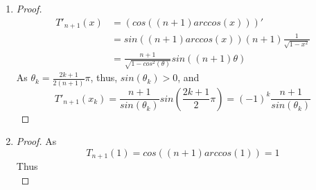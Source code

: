 \documentclass[paper=a4, fontsize=11pt]{scrartcl} %
\numberwithin{equation}{section} %
\numberwithin{figure}{section} %
\numberwithin{table}{section} %
\begin{document}
\begin{enumerate}
\begin{enumerate}
\begin{proof}
					Since both $LHS$ and $RHS$ are polynomials of order $n+1$, they are equivalent iff. they have same roots and leading coefficients.\\
					On the one hand,as for all $x_i$, where $i = 0, 1, ... , n$
					\begin{equation}
						T_{n+1}(x_i) = cos((n+1)\theta_i) = cos(\frac{2i+1}{2}\pi) = 0
					\end{equation}
					Thus, $LHS$ and $RHS$ have same roots. $RHS$ can therefore be written as
					\begin{equation}
						RHS(x) = c_r \omega(x)
					\end{equation}
					On the other hand, since
					\begin{equation}
						LHS'(x)|_{x=x_i} = (l_i(x) + (x-x_i)l_i'(x))|_{x=x_i} = 1
					\end{equation}
					and
					\begin{equation}
						RHS'(x)|_{x=x_i} = \frac{T'_{n+1}(x)}{T_{n+1}'(x_i)}\Big|_{x=x_i} = 1
					\end{equation}
					Thus, the leading coefficients of $LHS$ and $RHS$ are equal, namely $c_l = c_r$.\\
					Hence, $LHS=RHS$.
				\end{proof}
			\item 
				\begin{proof}
					\begin{equation}
						\begin{aligned}
							T'_{n+1}(x) & = (cos((n+1)arccos(x)))'\\
							            & = sin((n+1)arccos(x)) (n+1) \frac{1}{\sqrt{1-x^2}}\\
							            & = \frac{n+1}{\sqrt{1-cos^2(\theta)}} sin((n+1)\theta) 
						\end{aligned}
					\end{equation}
					As $\theta_k = \frac{2k+1}{2(n+1)}\pi$, thus, $sin(\theta_k) > 0$, and
					\begin{equation}
						T'_{n+1}(x_k) = \frac{n+1}{sin(\theta_k)} sin(\frac{2k+1}{2}\pi) = {(-1)}^k \frac{n+1}{sin(\theta_k)}
					\end{equation}
				\end{proof}
			\item
				\begin{proof}
					As
					\begin{equation}
						T_{n+1}(1) = cos((n+1)arccos(1)) = 1	
					\end{equation}
					Thus
					\begin{equation}

\end{equation}
\end{proof}
\end{enumerate}
\end{enumerate}
\end{document}
